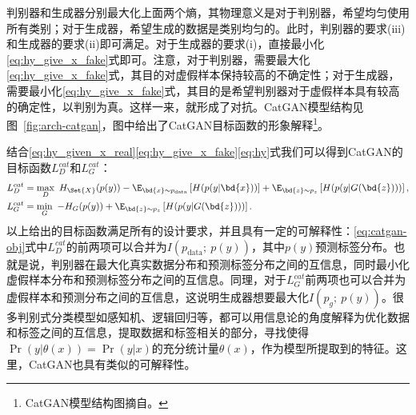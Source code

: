 判别器和生成器分别最大化上面两个熵，其物理意义是对于判别器，希望均匀使用所有类别；对于生成器，希望生成的数据是类别均匀的。此时，判别器的要求(iii)和生成器的要求(ii)即可满足。对于生成器的要求(i)，直接最小化\eqref{eq:hy_give_x_fake}式即可。注意，对于判别器，需要最大化\eqref{eq:hy_give_x_fake}式，其目的对虚假样本保持较高的不确定性；对于生成器，需要最小化\eqref{eq:hy_give_x_fake}式，其目的是希望判别器对于虚假样本具有较高的确定性，以判别为真。这样一来，就形成了对抗。CatGAN模型结构见图~\ref{fig:arch-catgan}，图中给出了CatGAN目标函数的形象解释\footnote{CatGAN模型结构图摘自\citet{springenberg2015unsupervised}。}。

结合\eqref{eq:hy_given_x_real}\eqref{eq:hy_give_x_fake}\eqref{eq:hy}式我们可以得到CatGAN的目标函数$L_D^{cat}$和$L_G^{cat}$：
\begin{equation}
  \begin{split}
    L_D^{cat} &= \max_D ~H_{\Set{X}}(p(y)) 
    - \E_{\bd{x}\sim p_{\text{data}}} \left[ H(p(y|\bd{x})) \right]
    + \E_{\bd{z} \sim p_z}\left[ H(p(y|G(\bd{z}))) \right], \\
    L_G^{cat} &= \min_G ~-H_{G}(p(y)) 
    + \E_{\bd{z} \sim p_z}\left[ H(p(y|G(\bd{z}))) \right].
  \end{split}
  \label{eq:catgan-obj}
\end{equation}
以上给出的目标函数满足所有的设计要求，并且具有一定的可解释性：\eqref{eq:catgan-obj}式中$L_D^{cat}$的前两项可以合并为$I(p_{\text{data}};~p(y))$，其中$p(y)$预测标签分布。也就是说，判别器在最大化真实数据分布和预测标签分布之间的互信息，同时最小化虚假样本分布和预测标签分布之间的互信息。同理，对于$L_G^{cat}$前两项也可以合并为虚假样本和预测分布之间的互信息，这说明生成器想要最大化$I(p_g; ~p(y))$。很多判别式分类模型如感知机、逻辑回归等，都可以用信息论的角度解释为优化数据和标签之间的互信息，提取数据和标签相关的部分，寻找使得$\Pr(y|\theta(x)) = \Pr(y|x)$的充分统计量$\theta(x)$，作为模型所提取到的特征。这里，CatGAN也具有类似的可解释性。

